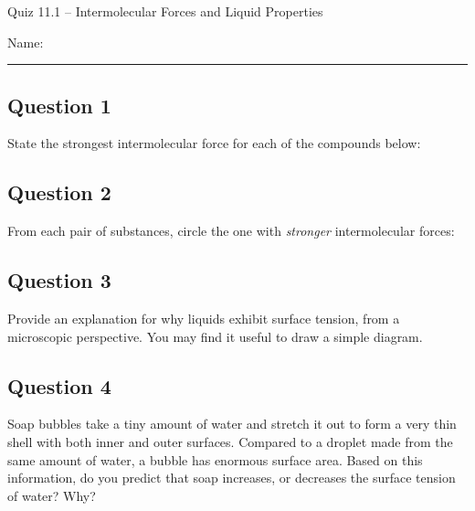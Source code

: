\documentclass[11pt, letterpaper]{memoir}
\begin{document}
	\begin{center}
		{\large	Quiz 11.1 -- Intermolecular Forces and Liquid Properties}
	\end{center}
	{\large Name: \rule[-1mm]{4in}{.1pt} 
	\subsection*{Question 1}
	State the strongest intermolecular force for each of the compounds below:
	
	
	\vspace{3em}
	\subsection*{Question 2}
	From each pair of substances, circle the one with \emph{stronger} intermolecular forces:
	
	
	\vspace{1em}
	\subsection*{Question 3}
	Provide an explanation for why liquids exhibit surface tension, from a microscopic perspective. You may find it useful to draw a simple diagram.
	
	\vspace{6em}
	\subsection*{Question 4}
	Soap bubbles take a tiny amount of water and stretch it out to form a very thin shell with both inner and outer surfaces. Compared to a droplet made from the same amount of water, a bubble has enormous surface area. Based on this information, do you predict that soap increases, or decreases the surface tension of water? Why?
	
	\vspace{4em}
}
\end{document}
